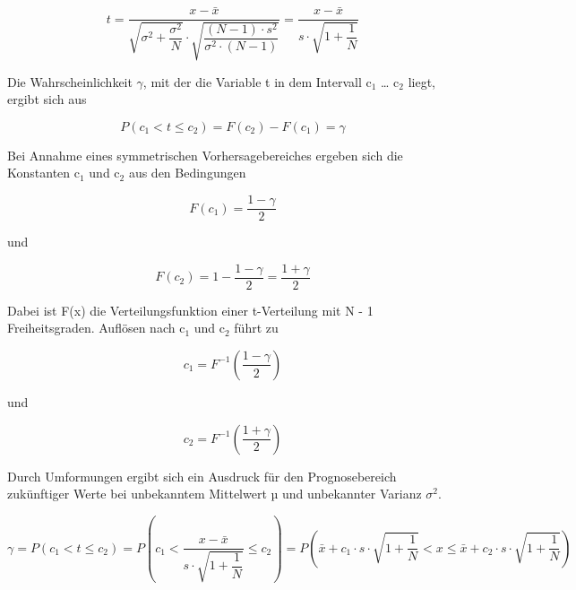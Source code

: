 \begin{equation}\label{eq:fivehundredfourtyeight}
t=\dfrac{x-\bar{x}}{\sqrt{\sigma ^{2} +\dfrac{\sigma ^{2} }{N}} \cdot \sqrt{\dfrac{(N-1)\cdot s^{2}}{\sigma ^{2} \cdot (N-1)}}} =\dfrac{x-\bar{x}}{s\cdot \sqrt{1+\dfrac{1}{N}}}
\end{equation}

\noindent Die Wahrscheinlichkeit $\gamma$, mit der die Variable t in dem Intervall c$_{1}$ {\dots} c$_{2}$ liegt, ergibt sich aus

\begin{equation}\label{eq:fivehundredfourtynine}
P(c_{1} <t\le c_{2})=F(c_{2})-F(c_{1})=\gamma
\end{equation}

\noindent Bei Annahme eines symmetrischen Vorhersagebereiches ergeben sich die Konstanten c$_{1}$ und c$_{2}$ aus den Bedingungen

\begin{equation}\label{eq:fivehundredfifty}
F(c_{1})=\dfrac{1-\gamma}{2}
\end{equation}

\noindent und 

\begin{equation}\label{eq:fivehundredfiftyone}
F(c_{2})=1-\dfrac{1-\gamma}{2} =\dfrac{1+\gamma}{2}
\end{equation}

\noindent Dabei ist F(x) die Verteilungsfunktion einer t-Verteilung mit N - 1 Freiheitsgraden. Aufl\"{o}sen nach c$_{1}$ und c$_{2}$ f\"{u}hrt zu

\begin{equation}\label{eq:fivehundredfiftytwo}
c_{1} =F^{-1} \left(\dfrac{1-\gamma }{2} \right)
\end{equation}

\noindent und

\begin{equation}\label{eq:fivehundredfiftythree}
c_{2} =F^{-1} \left(\dfrac{1+\gamma }{2} \right)
\end{equation}

\noindent Durch Umformungen ergibt sich ein Ausdruck f\"{u}r den Prognosebereich zuk\"{u}nftiger Werte bei unbekanntem Mittelwert µ und unbekannter Varianz $\sigma^{2}$.

\begin{equation}\label{eq:fivehundredfiftyfour}
\gamma =P\left(c_{1} <t\le c_{2} \right)=P\left(c_{1} <\dfrac{x-\bar{x}}{s\cdot \sqrt{1+\dfrac{1}{N}}} \le c_{2} \right)=P\left(\bar{x}+c_{1} \cdot s\cdot \sqrt{1+\dfrac{1}{N}} <x\le \bar{x}+c_{2} \cdot s\cdot \sqrt{1+\dfrac{1}{N}} \right)
\end{equation}

